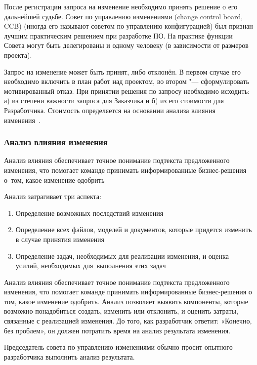 \documentclass{../industrial-development}
\begin{document}
\lecturenotes

После регистрации запроса на изменение необходимо принять решение о его дальнейшей судьбе. Совет по управлению изменениями (change control board, CCB) (иногда его называют советом по управлению конфигурацией) был признан лучшим практическим решением при разработке ПО. На практике функции Совета могут быть делегированы и одному человеку (в зависимости от размеров проекта).

Запрос на изменение может быть принят, либо отклонён. В первом случае его необходимо включить в план работ над проектом, во втором "--- сформулировать мотивированный отказ. При принятии решения по запросу необходимо исходить: а) из степени важности запроса для Заказчика и б) из его стоимости для Разработчика. Стоимость определяется на основании анализа влияния изменения~\cite[с.~75--76]{Maglinec}.



\begin{frame} \frametitle{Анализ влияния изменения}
Анализ влияния обеспечивает точное понимание подтекста предложенного изменения, что помогает команде принимать информированные бизнес-решения о~том, какое изменение одобрить

\setlength\parindent{0.5cm}Анализ затрагивает три аспекта:
	\begin{enumerate}
\item Определение возможных последствий изменения
\item Определение всех файлов, моделей и документов, которые придется изменить в случае принятия изменения
\item Определение задач, необходимых для реализации изменения, и оценка усилий, необходимых для~выполнения этих задач
  	\end{enumerate}
\end{frame}

\lecturenotes

Анализ влияния обеспечивает точное понимание подтекста предложенного изменения, что помогает команде принимать информированные бизнес-решения о том, какое изменение одобрить. Анализ позволяет выявить компоненты, которые возможно понадобиться создать, изменить или отклонить, и оценить затраты, связанные с реализацией изменения. До того, как разработчик ответит: «Конечно, без проблем», он должен потратить время на анализ результата изменения.

Председатель совета по управлению изменениями обычно просит опытного разработчика выполнить анализ результата.
\end{document}
